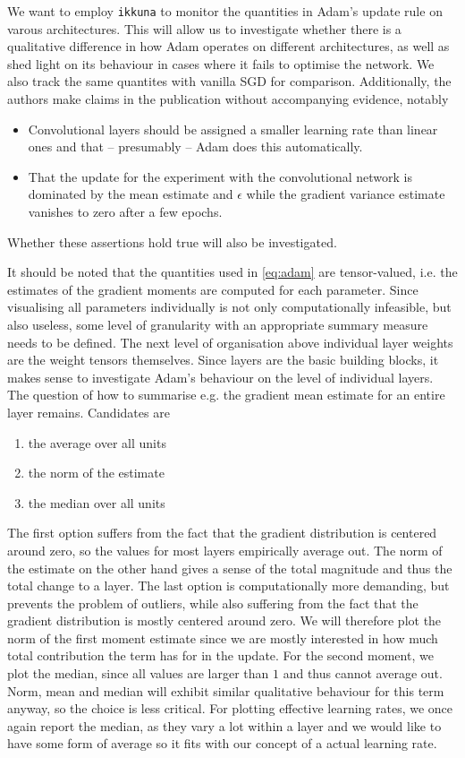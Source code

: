 We want to employ \texttt{ikkuna} to monitor the quantities in Adam's update
rule on varous architectures. This will allow us to investigate whether there is
a qualitative difference in how Adam operates on different architectures, as
well as shed light on its behaviour in cases where it fails to optimise the
network. We also track the same quantites with vanilla SGD for comparison.
Additionally, the authors make claims in the publication without accompanying
evidence, notably

\begin{itemize}
    \item \label{itm:adam-claim-1} Convolutional layers should be assigned a smaller learning rate than
        linear ones and that -- presumably -- Adam does this automatically.
    \item
        That the update for the experiment with the convolutional network is
        dominated by the mean estimate and $\epsilon$ while the gradient
        variance estimate vanishes to zero after a few epochs.
\end{itemize}
Whether these assertions hold true will also be investigated.

It should be noted that the quantities used in \cref{eq:adam} are tensor-valued,
i.e. the estimates of the gradient moments are computed for each parameter.
Since visualising all parameters individually is not only computationally
infeasible, but also useless, some level of granularity with an appropriate
summary measure needs to be defined. The next level of organisation above
individual layer weights are the weight tensors themselves. Since layers are the
basic building blocks, it makes sense to investigate Adam's behaviour on the
level of individual layers. The question of how to summarise e.g. the gradient
mean estimate for an entire layer remains. Candidates are
\begin{enumerate}
    \item the average over all units
    \item the norm of the estimate
    \item the median over all units
\end{enumerate}
The first option suffers from the fact that the gradient distribution is
centered around zero, so the values for most layers empirically average out.
The norm of the estimate on the other hand gives a sense of the total magnitude and thus the total
change to a layer. The last option is computationally more demanding, but
prevents the problem of outliers, while also suffering from the fact that the
gradient distribution is mostly centered around zero. We will therefore plot the
norm of the first moment estimate since we are mostly interested in how much
total contribution the term has for in the update. For the second moment, we
plot the median, since all values are larger than $1$ and thus cannot average
out. Norm, mean and median will exhibit similar qualitative behaviour for this
term anyway, so the choice is less critical. For plotting effective learning
rates, we once again report the median, as they vary a lot within a layer and we
would like to have some form of average so it fits with our concept of a
actual learning rate.

